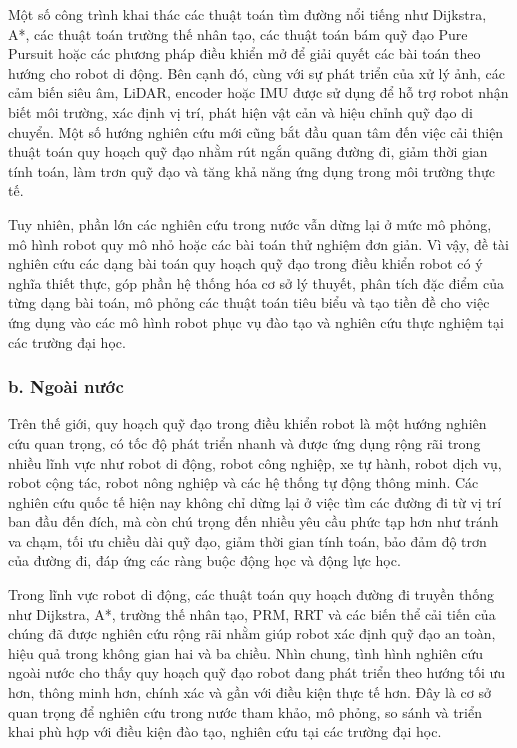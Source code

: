 \documentclass[12pt,a4paper,oneside]{report}
\begin{document}
Một số công trình khai thác các thuật toán tìm đường nổi tiếng như Dijkstra, A*, các thuật toán trường thế nhân tạo, các thuật toán bám quỹ đạo Pure Pursuit hoặc các phương pháp điều khiển mở để giải quyết các bài toán theo hướng cho robot di động. Bên cạnh đó, cùng với sự phát triển của xử lý ảnh, các cảm biến siêu âm, LiDAR, encoder hoặc IMU được sử dụng để hỗ trợ robot nhận biết môi trường, xác định vị trí, phát hiện vật cản và hiệu chỉnh quỹ đạo di chuyển. Một số hướng nghiên cứu mới cũng bắt đầu quan tâm đến việc cải thiện thuật toán quy hoạch quỹ đạo nhằm rút ngắn quãng đường đi, giảm thời gian tính toán, làm trơn quỹ đạo và tăng khả năng ứng dụng trong môi trường thực tế.

Tuy nhiên, phần lớn các nghiên cứu trong nước vẫn dừng lại ở mức mô phỏng, mô hình robot quy mô nhỏ hoặc các bài toán thử nghiệm đơn giản. Vì vậy, đề tài nghiên cứu các dạng bài toán quy hoạch quỹ đạo trong điều khiển robot có ý nghĩa thiết thực, góp phần hệ thống hóa cơ sở lý thuyết, phân tích đặc điểm của từng dạng bài toán, mô phỏng các thuật toán tiêu biểu và tạo tiền đề cho việc ứng dụng vào các mô hình robot phục vụ đào tạo và nghiên cứu thực nghiệm tại các trường đại học.

\subsubsection*{b. Ngoài nước}

Trên thế giới, quy hoạch quỹ đạo trong điều khiển robot là một hướng nghiên cứu quan trọng, có tốc độ phát triển nhanh và được ứng dụng rộng rãi trong nhiều lĩnh vực như robot di động, robot công nghiệp, xe tự hành, robot dịch vụ, robot cộng tác, robot nông nghiệp và các hệ thống tự động thông minh. Các nghiên cứu quốc tế hiện nay không chỉ dừng lại ở việc tìm các đường đi từ vị trí ban đầu đến đích, mà còn chú trọng đến nhiều yêu cầu phức tạp hơn như tránh va chạm, tối ưu chiều dài quỹ đạo, giảm thời gian tính toán, bảo đảm độ trơn của đường đi, đáp ứng các ràng buộc động học và động lực học.

Trong lĩnh vực robot di động, các thuật toán quy hoạch đường đi truyền thống như Dijkstra, A*, trường thế nhân tạo, PRM, RRT và các biến thể cải tiến của chúng đã được nghiên cứu rộng rãi nhằm giúp robot xác định quỹ đạo an toàn, hiệu quả trong không gian hai và ba chiều. Nhìn chung, tình hình nghiên cứu ngoài nước cho thấy quy hoạch quỹ đạo robot đang phát triển theo hướng tối ưu hơn, thông minh hơn, chính xác và gần với điều kiện thực tế hơn. Đây là cơ sở quan trọng để nghiên cứu trong nước tham khảo, mô phỏng, so sánh và triển khai phù hợp với điều kiện đào tạo, nghiên cứu tại các trường đại học.
\end{document}
